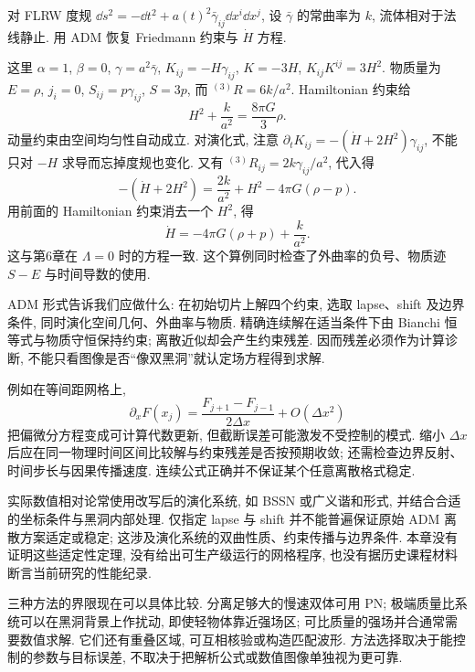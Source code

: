 \begin{example}
 对 FLRW 度规 $\dd s^2=-\dd t^2+a(t)^2\bar\gamma_{ij}\dd x^i\dd x^j$, 设 $\bar\gamma$ 的常曲率为 $k$, 流体相对于法线静止. 用 ADM 恢复 Friedmann 约束与 $\dot H$ 方程.
\end{example}
\begin{solution}
 这里 $\alpha=1$, $\beta=0$, $\gamma=a^2\bar\gamma$, $K_{ij}=-H\gamma_{ij}$, $K=-3H$, $K_{ij}K^{ij}=3H^2$. 物质量为 $E=\rho$, $j_i=0$, $S_{ij}=p\gamma_{ij}$, $S=3p$, 而 ${}^{(3)}R=6k/a^2$. Hamiltonian 约束给
 \[
 H^2+\frac k{a^2}=\frac{8\pi G}3\rho.
 \]
 动量约束由空间均匀性自动成立. 对演化式, 注意 $\partial_tK_{ij}=-(\dot H+2H^2)\gamma_{ij}$, 不能只对 $-H$ 求导而忘掉度规也变化. 又有 ${}^{(3)}R_{ij}=2k\gamma_{ij}/a^2$, 代入得
 \[
 -(\dot H+2H^2)=\frac{2k}{a^2}+H^2-4\pi G(\rho-p).
 \]
 用前面的 Hamiltonian 约束消去一个 $H^2$, 得
 \[
 \dot H=-4\pi G(\rho+p)+\frac k{a^2}.
 \]
 这与第6章在 $\Lambda=0$ 时的方程一致. 这个算例同时检查了外曲率的负号、物质迹 $S-E$ 与时间导数的使用.
\end{solution}


ADM 形式告诉我们应做什么: 在初始切片上解四个约束, 选取 lapse、shift 及边界条件, 同时演化空间几何、外曲率与物质. 精确连续解在适当条件下由 Bianchi 恒等式与物质守恒保持约束; 离散近似却会产生约束残差. 因而残差必须作为计算诊断, 不能只看图像是否“像双黑洞”就认定场方程得到求解.

例如在等间距网格上,
\[
 \partial_xF(x_j)=\frac{F_{j+1}-F_{j-1}}{2\Delta x}+O(\Delta x^2)
\]
把偏微分方程变成可计算代数更新, 但截断误差可能激发不受控制的模式. 缩小 $\Delta x$ 后应在同一物理时间区间比较解与约束残差是否按预期收敛; 还需检查边界反射、时间步长与因果传播速度. 连续公式正确并不保证某个任意离散格式稳定.

实际数值相对论常使用改写后的演化系统, 如 BSSN 或广义谐和形式, 并结合合适的坐标条件与黑洞内部处理. 仅指定 lapse 与 shift 并不能普遍保证原始 ADM 离散方案适定或稳定; 这涉及演化系统的双曲性质、约束传播与边界条件. 本章没有证明这些适定性定理, 没有给出可生产级运行的网格程序, 也没有据历史课程材料断言当前研究的性能纪录.

三种方法的界限现在可以具体比较. 分离足够大的慢速双体可用 PN; 极端质量比系统可以在黑洞背景上作扰动, 即使轻物体靠近强场区; 可比质量的强场并合通常需要数值求解. 它们还有重叠区域, 可互相核验或构造匹配波形. 方法选择取决于能控制的参数与目标误差, 不取决于把解析公式或数值图像单独视为更可靠.
